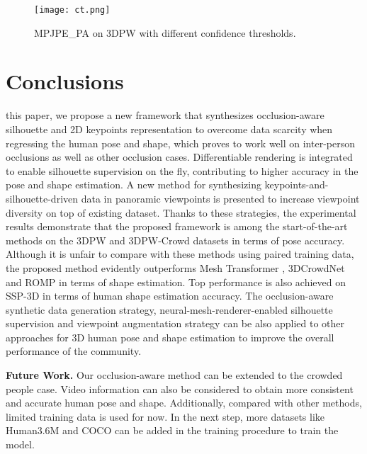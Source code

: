 \documentclass[journal]{IEEEtran}
\begin{document}
\begin{figure}[htbp]
    \centerline{\texttt{[image: ct.png]}}
    \caption{MPJPE\_PA on 3DPW with different confidence thresholds.}
    \label{fig:confidence}
\end{figure}

\section{Conclusions}
 this paper, we propose a new framework that synthesizes occlusion-aware silhouette and 2D keypoints representation to overcome data scarcity when regressing the human pose and shape, which proves to work well on inter-person occlusions as well as other occlusion cases. Differentiable rendering is integrated to enable silhouette supervision on the fly, contributing to higher accuracy in the pose and shape estimation. A new method for synthesizing keypoints-and-silhouette-driven data in panoramic viewpoints is presented to increase viewpoint diversity on top of existing dataset. Thanks to these strategies, the experimental results demonstrate that the proposed framework is among the start-of-the-art methods on the 3DPW and 3DPW-Crowd datasets in terms of pose accuracy. Although it is unfair to compare with these methods using paired training data, the proposed method evidently outperforms Mesh Transformer \cite{lin2021end-to-end}, 3DCrowdNet \cite{choi20213dcrowdnet} and ROMP \cite{ROMP} in terms of shape estimation. Top performance is also achieved on SSP-3D in terms of human shape estimation accuracy. The occlusion-aware synthetic data generation strategy, neural-mesh-renderer-enabled silhouette supervision and viewpoint augmentation strategy can be also applied to other approaches for 3D human pose and shape estimation to improve the overall performance of the community.

\noindent\textbf{Future Work.}  Our occlusion-aware method can be extended to the crowded people case. Video information can also be considered to obtain more consistent and accurate human pose and shape. Additionally, compared with other methods, limited training data is used for now. In the next step, more datasets like Human3.6M and COCO can be added in the training procedure to train the model.

\end{document}
